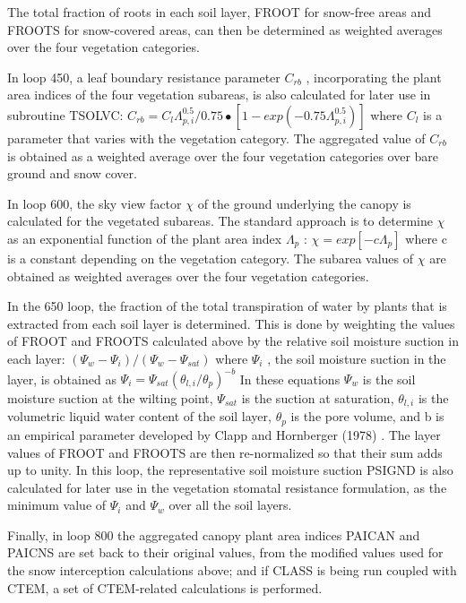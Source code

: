 The total fraction of roots in each soil layer, F\+R\+O\+O\+T for snow-\/free areas and F\+R\+O\+O\+T\+S for snow-\/covered areas, can then be determined as weighted averages over the four vegetation categories.

In loop 450, a leaf boundary resistance parameter $C_{rb}$ , incorporating the plant area indices of the four vegetation subareas, is also calculated for later use in subroutine T\+S\+O\+L\+V\+C\+: $C_{rb} = C_l \Lambda_{p,i}^{0.5} /0.75 \bullet [1 - exp(-0.75 \Lambda_{p,i}^{0.5} )]$ where $C_l$ is a parameter that varies with the vegetation category. The aggregated value of $C_{rb}$ is obtained as a weighted average over the four vegetation categories over bare ground and snow cover.

In loop 600, the sky view factor $\chi$ of the ground underlying the canopy is calculated for the vegetated subareas. The standard approach is to determine $\chi$ as an exponential function of the plant area index $\Lambda_p$ \+: $\chi = exp[-c \Lambda_p ]$ where c is a constant depending on the vegetation category. The subarea values of $\chi$ are obtained as weighted averages over the four vegetation categories.

In the 650 loop, the fraction of the total transpiration of water by plants that is extracted from each soil layer is determined. This is done by weighting the values of F\+R\+O\+O\+T and F\+R\+O\+O\+T\+S calculated above by the relative soil moisture suction in each layer\+: $( \Psi_w - \Psi_i )/( \Psi_w - \Psi_{sat} )$ where $\Psi_i$ , the soil moisture suction in the layer, is obtained as $\Psi_i = \Psi_{sat} ( \theta_{l,i} / \theta_p )^{-b}$ In these equations $\Psi_w$ is the soil moisture suction at the wilting point, $\Psi_{sat}$ is the suction at saturation, $\theta_{l,i}$ is the volumetric liquid water content of the soil layer, $\theta_p$ is the pore volume, and b is an empirical parameter developed by Clapp and Hornberger (1978) \cite{Clapp1978-898}. The layer values of F\+R\+O\+O\+T and F\+R\+O\+O\+T\+S are then re-\/normalized so that their sum adds up to unity. In this loop, the representative soil moisture suction P\+S\+I\+G\+N\+D is also calculated for later use in the vegetation stomatal resistance formulation, as the minimum value of $\Psi_i$ and $\Psi_w$ over all the soil layers.

Finally, in loop 800 the aggregated canopy plant area indices P\+A\+I\+C\+A\+N and P\+A\+I\+C\+N\+S are set back to their original values, from the modified values used for the snow interception calculations above; and if C\+L\+A\+S\+S is being run coupled with C\+T\+E\+M, a set of C\+T\+E\+M-\/related calculations is performed.